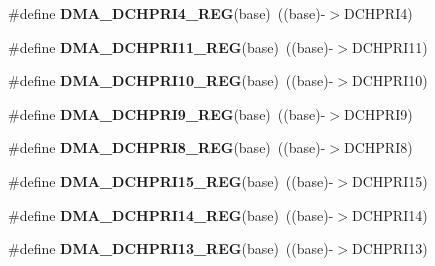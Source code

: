 \begin{DoxyCompactItemize}
\item 
\#define {\bfseries D\+M\+A\+\_\+\+D\+C\+H\+P\+R\+I4\+\_\+\+R\+EG}(base)~((base)-\/$>$D\+C\+H\+P\+R\+I4)\hypertarget{group__DMA__Register__Accessor__Macros_ga21ab8bc143d570cabf1b6ae2b572c8ec}{}\label{group__DMA__Register__Accessor__Macros_ga21ab8bc143d570cabf1b6ae2b572c8ec}

\item 
\#define {\bfseries D\+M\+A\+\_\+\+D\+C\+H\+P\+R\+I11\+\_\+\+R\+EG}(base)~((base)-\/$>$D\+C\+H\+P\+R\+I11)\hypertarget{group__DMA__Register__Accessor__Macros_gaa5261c483b946c45d7ed9fdf47b1a34f}{}\label{group__DMA__Register__Accessor__Macros_gaa5261c483b946c45d7ed9fdf47b1a34f}

\item 
\#define {\bfseries D\+M\+A\+\_\+\+D\+C\+H\+P\+R\+I10\+\_\+\+R\+EG}(base)~((base)-\/$>$D\+C\+H\+P\+R\+I10)\hypertarget{group__DMA__Register__Accessor__Macros_ga537f4bcd1dd1f0779a7b264fa10f7de8}{}\label{group__DMA__Register__Accessor__Macros_ga537f4bcd1dd1f0779a7b264fa10f7de8}

\item 
\#define {\bfseries D\+M\+A\+\_\+\+D\+C\+H\+P\+R\+I9\+\_\+\+R\+EG}(base)~((base)-\/$>$D\+C\+H\+P\+R\+I9)\hypertarget{group__DMA__Register__Accessor__Macros_ga3d17995d1458386ea07705da175de86c}{}\label{group__DMA__Register__Accessor__Macros_ga3d17995d1458386ea07705da175de86c}

\item 
\#define {\bfseries D\+M\+A\+\_\+\+D\+C\+H\+P\+R\+I8\+\_\+\+R\+EG}(base)~((base)-\/$>$D\+C\+H\+P\+R\+I8)\hypertarget{group__DMA__Register__Accessor__Macros_ga41f8017add177a2fbaea0369add2fa14}{}\label{group__DMA__Register__Accessor__Macros_ga41f8017add177a2fbaea0369add2fa14}

\item 
\#define {\bfseries D\+M\+A\+\_\+\+D\+C\+H\+P\+R\+I15\+\_\+\+R\+EG}(base)~((base)-\/$>$D\+C\+H\+P\+R\+I15)\hypertarget{group__DMA__Register__Accessor__Macros_ga18c8c0dbaea753e278296288a71c23ac}{}\label{group__DMA__Register__Accessor__Macros_ga18c8c0dbaea753e278296288a71c23ac}

\item 
\#define {\bfseries D\+M\+A\+\_\+\+D\+C\+H\+P\+R\+I14\+\_\+\+R\+EG}(base)~((base)-\/$>$D\+C\+H\+P\+R\+I14)\hypertarget{group__DMA__Register__Accessor__Macros_ga47e2dd873969a5ff7b815f0953aac1cb}{}\label{group__DMA__Register__Accessor__Macros_ga47e2dd873969a5ff7b815f0953aac1cb}

\item 
\#define {\bfseries D\+M\+A\+\_\+\+D\+C\+H\+P\+R\+I13\+\_\+\+R\+EG}(base)~((base)-\/$>$D\+C\+H\+P\+R\+I13)\hypertarget{group__DMA__Register__Accessor__Macros_ga06f3ecabededad6f1746d4037c8b69dd}{}\label{group__DMA__Register__Accessor__Macros_ga06f3ecabededad6f1746d4037c8b69dd}


\end{DoxyCompactItemize}
